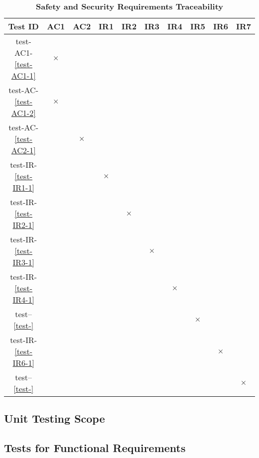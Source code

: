 \documentclass[12pt, titlepage]{article}
\begin{document}
\begin{landscape}
\begin{table} [H]
  \centering
  \begin{tabular}{|c|c|c|c|c|c|c|c|c|c|}
  \hline
  Test ID & AC1 & AC2 & IR1 & IR2 & IR3 & IR4 & IR5 & IR6 & IR7 \\
  \hline
  test-AC1-\ref{test-AC1-1} & $\times$ & & & & & & & & \\
  \hline
  test-AC-\ref{test-AC1-2} & $\times$ & & & & & & & & \\
  \hline
  test-AC-\ref{test-AC2-1} & & $\times$ & & & & & & & \\
  \hline
  test-IR-\ref{test-IR1-1} & & & $\times$ & & & & & &  \\
  \hline
  test-IR-\ref{test-IR2-1}  & & & & $\times$ & & & & & \\
  \hline
  test-IR-\ref{test-IR3-1}  & & & & & $\times$ & & & & \\
  \hline
  test-IR-\ref{test-IR4-1}  & & & & & & $\times$ & & & \\
  \hline
  test--\ref{test-}  & & & & & & & $\times$ & & \\
  \hline
  test-IR-\ref{test-IR6-1}  & & & & & & & & $\times$ & \\
  \hline
  test--\ref{test-}  & & & & & & & & & $\times$ \\
  \hline
\end{tabular}
\caption{\bf Safety and Security Requirements Traceability} \label{tab:sns-test-traceability}
\end{table}

\end{landscape}
\newpage




\subsection{Unit Testing Scope}


\subsection{Tests for Functional Requirements}
\end{document}
